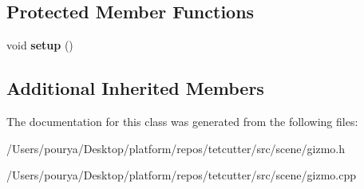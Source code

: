 \subsection*{Protected Member Functions}
\begin{DoxyCompactItemize}
\item 
\hypertarget{classps_1_1scene_1_1GizmoRotate_af2e52ea84e3368f8a47acbd5823acd31}{}void {\bfseries setup} ()\label{classps_1_1scene_1_1GizmoRotate_af2e52ea84e3368f8a47acbd5823acd31}

\end{DoxyCompactItemize}
\subsection*{Additional Inherited Members}


The documentation for this class was generated from the following files\+:\begin{DoxyCompactItemize}
\item 
/\+Users/pourya/\+Desktop/platform/repos/tetcutter/src/scene/gizmo.\+h\item 
/\+Users/pourya/\+Desktop/platform/repos/tetcutter/src/scene/gizmo.\+cpp\end{DoxyCompactItemize}
